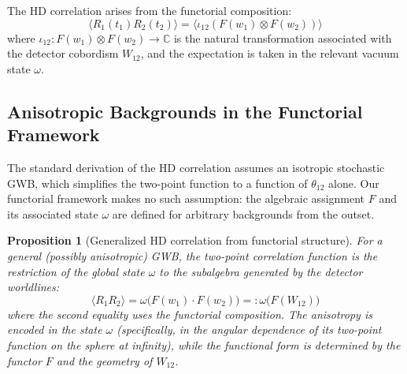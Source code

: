 \documentclass[11pt,a4paper]{article}
\newtheorem{proposition}{Proposition}[section]
\begin{document}
The HD correlation arises from the functorial composition:
\begin{equation}
\langle R_1(t_1) R_2(t_2) \rangle = \langle \iota_{12}(F(w_1) \otimes F(w_2)) \rangle
\end{equation}
where $\iota_{12}: F(w_1) \otimes F(w_2) \to \mathbb{C}$ is the natural transformation associated with the detector cobordism $W_{12}$, and the expectation is taken in the relevant vacuum state $\omega$.

\subsection{Anisotropic Backgrounds in the Functorial Framework}\label{sec:anisotropic}

The standard derivation of the HD correlation assumes an isotropic stochastic GWB, which simplifies the two-point function to a function of $\theta_{12}$ alone. Our functorial framework makes no such assumption: the algebraic assignment $F$ and its associated state $\omega$ are defined for arbitrary backgrounds from the outset.

\begin{proposition}[Generalized HD correlation from functorial structure]
For a general (possibly anisotropic) GWB, the two-point correlation function is the restriction of the global state $\omega$ to the subalgebra generated by the detector worldlines:
\begin{equation}
\langle R_1 R_2 \rangle = \omega\bigl(F(w_1) \cdot F(w_2)\bigr) =: \omega\bigl(F(W_{12})\bigr)
\end{equation}
where the second equality uses the functorial composition. The anisotropy is encoded in the state $\omega$ (specifically, in the angular dependence of its two-point function on the sphere at infinity), while the functional form is determined by the functor $F$ and the geometry of $W_{12}$.
\end{proposition}
\end{document}
